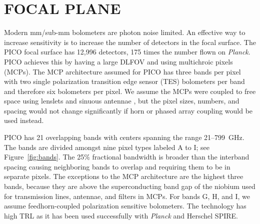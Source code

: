 \documentclass[]{spie}  %
\newcommand{\comr}[1]{\textcolor{red}{#1}}
\newcommand{\comb}[1]{\textcolor{blue}{#1}}
\begin{document}
\section{FOCAL PLANE}
\label{sec:focalplane}

Modern mm/sub-mm bolometers are photon noise limited. An 
effective way to increase sensitivity is to increase the number of detectors in the focal surface. %
The PICO focal surface has 12,996 detectors, 175 times the number flown on \textit{Planck}. PICO achieves this by 
having a large DLFOV and using multichroic pixels (MCPs)\cite{Suzuki2014_samps,datta2014_mcp}. 
The MCP architecture assumed for PICO has three bands per pixel with two single polarization transition 
edge sensor (TES) bolometers per band and therefore six bolometers per pixel. 
We assume the MCPs were coupled to free space using lenslets and sinuous antennae \cite{Suzuki2014_samps}, 
but the pixel sizes, numbers, and spacing would not change significantly 
if horn or phased array coupling would be used instead.

PICO has 21 overlapping bands with centers spanning the range 21--799~GHz. The bands are divided amongst 
nine pixel types labeled A to I; see Figure~\ref{fig:bands}. 
The 25\% fractional bandwidth is broader than the interband spacing causing neighboring bands to 
overlap and requiring them to be in separate pixels. 
The exceptions to the MCP architecture are the highest three bands, because they are above the superconducting 
band gap of the niobium used for transmission lines, antennae, and filters in MCPs.  
For bands G, H, and I, we assume feedhorn-coupled polarization sensitive bolometers. The technology has high TRL 
as it has been used successfully with 
\textit{Planck}\cite{planck2010_hfi} and Herschel SPIRE\cite{spire2010}.
\end{document}
